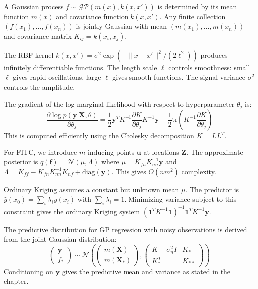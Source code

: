 \begin{solution}
A Gaussian process $f \sim \mathcal{GP}(m(x), k(x,x'))$ is determined by its mean function $m(x)$ and covariance function $k(x,x')$. Any finite collection $(f(x_1), \ldots, f(x_n))$ is jointly Gaussian with mean $(m(x_1), \ldots, m(x_n))$ and covariance matrix $K_{ij} = k(x_i, x_j)$.
\end{solution}

\begin{solution}
The RBF kernel $k(x,x') = \sigma^2 \exp(-\|x-x'\|^2/(2\ell^2))$ produces infinitely differentiable functions. The length scale $\ell$ controls smoothness: small $\ell$ gives rapid oscillations, large $\ell$ gives smooth functions. The signal variance $\sigma^2$ controls the amplitude.
\end{solution}

\begin{solution}
The gradient of the log marginal likelihood with respect to hyperparameter $\theta_j$ is:
\[
\frac{\partial \log p(\mathbf{y}|\mathbf{X}, \theta)}{\partial \theta_j} = \frac{1}{2} \mathbf{y}^T K^{-1} \frac{\partial K}{\partial \theta_j} K^{-1} \mathbf{y} - \frac{1}{2} \text{tr}\left(K^{-1} \frac{\partial K}{\partial \theta_j}\right)
\]
This is computed efficiently using the Cholesky decomposition $K = LL^T$.
\end{solution}

\begin{solution}
For FITC, we introduce $m$ inducing points $\mathbf{u}$ at locations $\mathbf{Z}$. The approximate posterior is $q(\mathbf{f}) = \mathcal{N}(\mu, \Lambda)$ where $\mu = K_{fn}K_{nn}^{-1}\mathbf{y}$ and $\Lambda = K_{ff} - K_{fn}K_{nn}^{-1}K_{nf} + \text{diag}(\mathbf{y})$. This gives $O(nm^2)$ complexity.
\end{solution}

\begin{solution}
Ordinary Kriging assumes a constant but unknown mean $\mu$. The predictor is $\hat{y}(x_0) = \sum_i \lambda_i y(x_i)$ with $\sum_i \lambda_i = 1$. Minimizing variance subject to this constraint gives the ordinary Kriging system $(\mathbf{1}^T K^{-1} \mathbf{1})^{-1} \mathbf{1}^T K^{-1} \mathbf{y}$.
\end{solution}

\begin{solution}
The predictive distribution for GP regression with noisy observations is derived from the joint Gaussian distribution:
\[
\begin{pmatrix} \mathbf{y} \\ f_* \end{pmatrix} \sim \mathcal{N}\left(\begin{pmatrix} m(\mathbf{X}) \\ m(\mathbf{X}_*) \end{pmatrix}, \begin{pmatrix} K + \sigma_n^2 I & K_* \\ K_*^T & K_{**} \end{pmatrix}\right)
\]
Conditioning on $\mathbf{y}$ gives the predictive mean and variance as stated in the chapter.
\end{solution}

